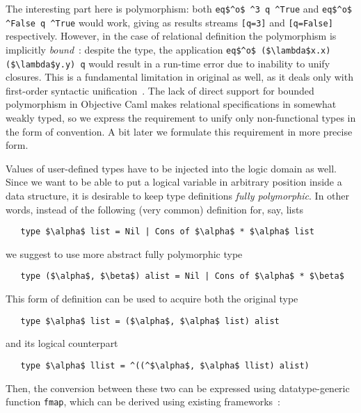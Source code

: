 The interesting part here is polymorphism: both \lstinline|eq$^o$ ^3 q ^True| and \lstinline|eq$^o$ ^False q ^True| would work, 
giving as results streams \lstinline|[q=3]| and \lstinline|[q=False]| respectively. However, in the case of relational definition
the polymorphism is implicitly \emph{bound}~\cite{cardelli}: despite the type, the application \lstinline|eq$^o$ ($\lambda$x.x) ($\lambda$y.y) q|
would result in a run-time error due to inability to unify closures. This is a fundamental limitation in original \miniKanren as well, as it
deals only with first-order syntactic unification~\cite{Unification}. The lack of direct support for bounded polymorphism in Objective Caml
makes relational specifications in \ocanren somewhat weakly typed, so we express the requirement to unify only non-functional types in the form 
of convention. A bit later we formulate this requirement in more precise form.

Values of user-defined types have to be injected into the logic domain as well. Since we want to be 
able to put a logical variable in arbitrary position inside a data structure, it is desirable to keep type definitions
\emph{fully polymorphic}. In other words, instead of the following (very common) definition for, say, lists

\begin{lstlisting}
   type $\alpha$ list = Nil | Cons of $\alpha$ * $\alpha$ list
\end{lstlisting}

\noindent we suggest to use more abstract fully polymorphic type

\begin{lstlisting}
   type ($\alpha$, $\beta$) alist = Nil | Cons of $\alpha$ * $\beta$
\end{lstlisting}

This form of definition can be used to acquire both the original type

\begin{lstlisting}
   type $\alpha$ list = ($\alpha$, $\alpha$ list) alist
\end{lstlisting}

\noindent and its logical counterpart

\begin{lstlisting}
   type $\alpha$ llist = ^((^$\alpha$, $\alpha$ llist) alist)
\end{lstlisting}

Then, the conversion between these two can be expressed using datatype-generic~\cite{DGP} function
\lstinline|fmap|, which can be derived using existing frameworks~\cite{Deriving}:

